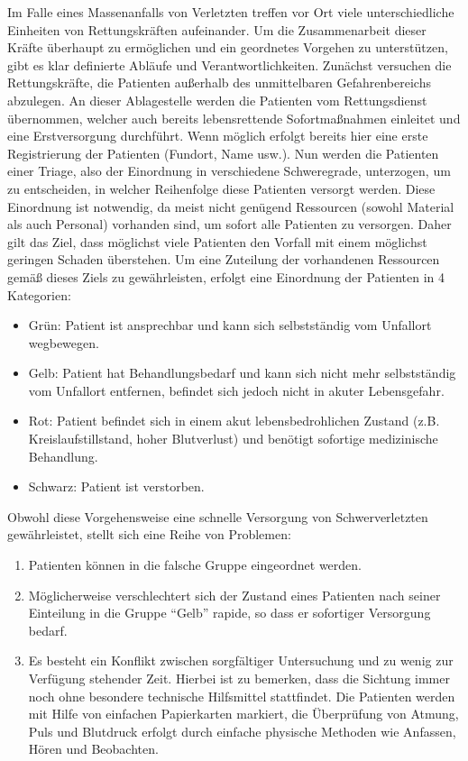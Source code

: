 Im Falle eines Massenanfalls von Verletzten treffen vor Ort viele unterschiedliche Einheiten von
Rettungskräften aufeinander. Um die Zusammenarbeit dieser Kräfte überhaupt zu ermöglichen und ein
geordnetes Vorgehen zu unterstützen, gibt es klar definierte Abläufe und Verantwortlichkeiten. Zunächst
versuchen die Rettungskräfte, die Patienten außerhalb des unmittelbaren Gefahrenbereichs abzulegen.
An dieser Ablagestelle werden die Patienten vom Rettungsdienst übernommen, welcher auch bereits
lebensrettende Sofortmaßnahmen einleitet und eine Erstversorgung durchführt. Wenn möglich erfolgt
bereits hier eine erste Registrierung der Patienten (Fundort, Name usw.).
Nun werden die Patienten einer Triage, also der Einordnung in verschiedene Schweregrade,
unterzogen, um zu entscheiden, in welcher Reihenfolge diese Patienten versorgt werden.
Diese Einordnung ist notwendig, da meist nicht genügend Ressourcen (sowohl Material als auch
Personal) vorhanden sind, um sofort alle Patienten zu versorgen. Daher gilt das Ziel, dass möglichst
viele Patienten den Vorfall mit einem möglichst geringen Schaden überstehen. Um eine Zuteilung der
vorhandenen Ressourcen gemäß dieses Ziels zu gewährleisten, erfolgt eine Einordnung der Patienten in
4 Kategorien\cite{Katastrophenmedizin}:

\begin{itemize}
    \item{Grün:} Patient ist ansprechbar und kann sich selbstständig vom Unfallort wegbewegen.
    \item{Gelb:} Patient hat Behandlungsbedarf und kann sich nicht mehr selbstständig vom Unfallort entfernen, 
                 befindet sich jedoch nicht in akuter Lebensgefahr.
    \item{Rot:}  Patient befindet sich in einem akut lebensbedrohlichen Zustand (z.B. Kreislaufstillstand, hoher
                 Blutverlust) und benötigt sofortige medizinische Behandlung.
    \item{Schwarz:} Patient ist verstorben.
\end{itemize}

Obwohl diese Vorgehensweise eine schnelle Versorgung von Schwerverletzten gewährleistet, stellt
sich eine Reihe von Problemen:

\begin{enumerate}
    \item Patienten können in die falsche Gruppe eingeordnet werden.
    \item Möglicherweise verschlechtert sich der Zustand eines Patienten nach seiner Einteilung in die Gruppe
          "`Gelb"' rapide, so dass er sofortiger Versorgung bedarf.
    \item Es besteht ein Konflikt zwischen sorgfältiger Untersuchung und zu wenig zur Verfügung stehender
          Zeit. Hierbei ist zu bemerken, dass die Sichtung immer noch ohne besondere technische Hilfsmittel
          stattfindet. Die Patienten werden mit Hilfe von einfachen Papierkarten markiert, die Überprüfung von
          Atmung, Puls und Blutdruck erfolgt durch einfache physische Methoden wie Anfassen, Hören und
          Beobachten.
\end{enumerate}

